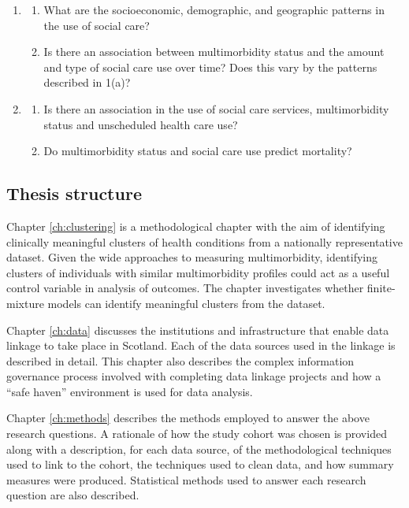\documentclass[12pt,]{report}
\begin{document}
\begin{enumerate}
\def\labelenumi{\arabic{enumi}.}
\item
  \begin{enumerate}[noitemsep]
  \item What are the socioeconomic, demographic, and geographic patterns in the use of social care? \item Is there an association between multimorbidity status and the amount and type of social care use over time? Does this vary by the patterns described in 1(a)?  
  \end{enumerate}
\item
  \begin{enumerate}[noitemsep]
  \item Is there an association in the use of social care services, multimorbidity status and unscheduled health care use?
  \item Do multimorbidity status and social care use predict mortality?
  \end{enumerate}
\end{enumerate}

\subsection{Thesis structure}\label{sec:lit-review-structure}

Chapter \ref{ch:clustering} is a methodological chapter with the aim of
identifying clinically meaningful clusters of health conditions from a
nationally representative dataset. Given the wide approaches to
measuring multimorbidity, identifying clusters of individuals with
similar multimorbidity profiles could act as a useful control variable
in analysis of outcomes. The chapter investigates whether finite-mixture
models can identify meaningful clusters from the dataset.

Chapter \ref{ch:data} discusses the institutions and infrastructure that
enable data linkage to take place in Scotland. Each of the data sources
used in the linkage is described in detail. This chapter also describes
the complex information governance process involved with completing data
linkage projects and how a ``safe haven'' environment is used for data
analysis.

Chapter \ref{ch:methods} describes the methods employed to answer the
above research questions. A rationale of how the study cohort was chosen
is provided along with a description, for each data source, of the
methodological techniques used to link to the cohort, the techniques
used to clean data, and how summary measures were produced. Statistical
methods used to answer each research question are also described.
\end{document}
